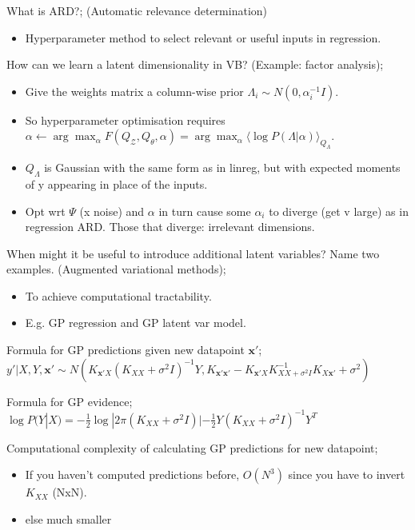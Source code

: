 \documentclass{article}
\begin{document}
What is ARD?; (Automatic relevance determination) \begin{itemize} \item Hyperparameter method to select relevant or useful inputs in regression.  \end{itemize} 

How can we learn a latent dimensionality in VB? (Example: factor analysis); \begin{itemize} \item Give the weights matrix a column-wise prior $\Lambda_i \sim N(0, \alpha_i^{-1}I)$.  \item So hyperparameter optimisation requires $\alpha \leftarrow \arg\max_{\alpha} F(Q_\mathcal{Z}, Q_\theta, \alpha) = \arg\max_\alpha \langle \log P(\Lambda |\alpha)\rangle_{Q_\Lambda}$.  \item $Q_\Lambda$ is Gaussian with the same form as in linreg, but with expected moments of y appearing in place of the inputs.  \item Opt wrt $\Psi$ (x noise) and $\alpha$ in turn cause some $\alpha_i$ to diverge (get v large) as in regression ARD. Those that diverge: irrelevant dimensions.  \end{itemize}

When might it be useful to introduce additional latent variables? Name two examples. (Augmented variational methods); \begin{itemize} \item To achieve computational tractability.  \item E.g. GP regression and GP latent var model.  \end{itemize}


Formula for GP predictions given new datapoint $\mathbf{x'}$; $y'|X, Y, \mathbf{x'} \sim N(K_{\mathbf{x'}X}(K_{XX}+\sigma^2I)^{-1}Y, K_{\mathbf{x'x'}}-K_{\mathbf{x'}X}K_{XX+\sigma^2I}^{-1}K_{X\mathbf{x'}}+\sigma^2)$

Formula for GP evidence; $\log P(Y|X) = -\frac{1}{2}\log|2\pi(K_{XX}+\sigma^2I)|-\frac{1}{2}Y(K_{XX}+\sigma^2I)^{-1}Y^T$ 

Computational complexity of calculating GP predictions for new datapoint; \begin{itemize} \item If you haven't computed predictions before, $O(N^3)$ since you have to invert $K_{XX}$ (NxN). \item else much smaller \end{itemize}
\end{document}
